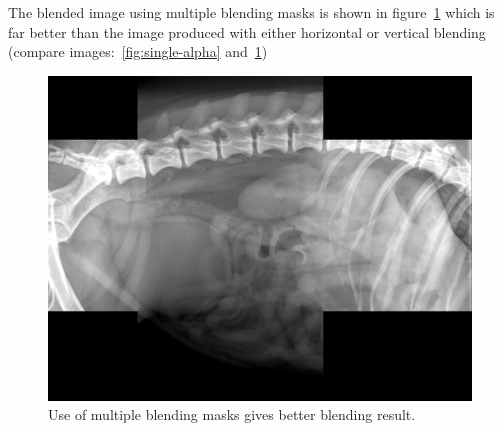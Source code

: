 \noindent The blended image using multiple blending masks is shown in figure~\ref{fig:blending-complex-alignment} which is far better than the image produced with either horizontal or vertical blending (compare images:~\ref{fig:single-alpha} and~\ref{fig:blending-complex-alignment})

\begin{figure}[H]%
\centering
\includegraphics[scale=0.15]{2.mainmatter/2.Methodology/figures/multi-alpha}
\caption[Blending with Masks]{Use of multiple blending masks gives better blending result.}%
\label{fig:blending-complex-alignment}%
\end{figure}




